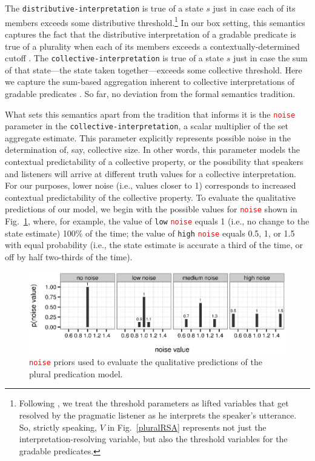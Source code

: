 \documentclass[linguex]{sp}
\begin{document}
The \texttt{distributive-interpretation} is true of a state $s$ just in case each of its members exceeds some distributive threshold.\footnote{Following \cite{lassitergoodman2013}, we treat the threshold parameters as lifted variables that get resolved by the pragmatic listener as he interprets the speaker's utterance. So, strictly speaking, $V$ in Fig.~\ref{pluralRSA} represents not just the interpretation-resolving variable, but also the threshold variables for the gradable predicates.} In our box setting, this semantics captures the fact that the distributive interpretation of a gradable predicate is true of a plurality when each of its members exceeds a contextually-determined cutoff \citep{kennedy1999,lassitergoodman2013}. The \texttt{collective-interpretation} is true of a state $s$ just in case the sum of that state---the state taken together---exceeds some collective threshold. Here we capture the sum-based aggregation inherent to collective interpretations of gradable predicates \citep{scha1984}. So far, no deviation from the formal semantics tradition.

What sets this semantics apart from the tradition that informs it is the \textcolor{red}{\texttt{noise}} parameter in the \texttt{collective-interpretation}, a scalar multiplier of the set aggregate estimate. This parameter explicitly represents possible noise in the determination of, say, collective size. In other words, this parameter models the contextual predictability of a collective property, or the possibility that speakers and listeners will arrive at different truth values for a collective interpretation. For our purposes, lower noise (i.e., values closer to 1) corresponds to increased contextual predictability of the collective property. To evaluate the qualitative predictions of our model, we begin with the possible values for \textcolor{red}{\texttt{noise}} shown in Fig.~\ref{noises}, where, for example, the value of \texttt{low} \textcolor{red}{\texttt{noise}} equals 1 (i.e., no change to the state estimate) 100\% of the time; the value of \texttt{high} \textcolor{red}{\texttt{noise}} equals 0.5, 1, or 1.5 with equal probability (i.e., the state estimate is accurate a third of the time, or off by half two-thirds of the time).

\begin{figure}[h]
	\centering
	\includegraphics[width=\linewidth]{plots/noise_plots.eps}
	\vspace{-20pt}
	\caption{\textcolor{red}{\texttt{noise}} priors used to evaluate the qualitative predictions of the plural predication model.} \label{noises}
\end{figure}
\end{document}
